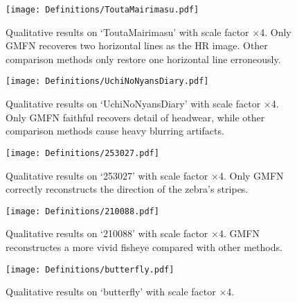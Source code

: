 \documentclass{bmvc2k}
\begin{document}
\begin{figure}[htbp]
	\centering
	{\texttt{[image: Definitions/ToutaMairimasu.pdf]}} 
	\caption{Qualitative results on `ToutaMairimasu' with scale factor $\times$4. Only GMFN recoveres two horizontal lines as the HR image. Other comparison methods only restore one horizontal line erroneously.}
	\label{fig:ToutaMairimasu}
\end{figure}

\begin{figure}[htbp]
	\centering
	{\texttt{[image: Definitions/UchiNoNyansDiary.pdf]}} 
	\caption{Qualitative results on `UchiNoNyansDiary' with scale factor $\times$4. Only GMFN faithful recovers detail of headwear, while other comparison methods cause heavy blurring artifacts.}
	\label{fig:UchiNoNyansDiary}
\end{figure}


\begin{figure}[htbp]
	\centering
	{\texttt{[image: Definitions/253027.pdf]}} 
	\caption{Qualitative results on `253027' with scale factor $\times$4. Only GMFN correctly reconstructs the direction of the zebra's stripes.}
	\label{fig:253027}
\end{figure}

\begin{figure}[htbp]
	\centering
	{\texttt{[image: Definitions/210088.pdf]}} 
	\caption{Qualitative results on `210088' with scale factor $\times$4. GMFN reconstructes a more vivid fisheye compared with other methods.}
	\label{fig:210088}
\end{figure}


\begin{figure}[htbp]
	\centering
	{\texttt{[image: Definitions/butterfly.pdf]}} 
	\caption{Qualitative results on `butterfly' with scale factor $\times$4.}
	\label{fig:butterfly}
\end{figure}

 	
\end{document}
